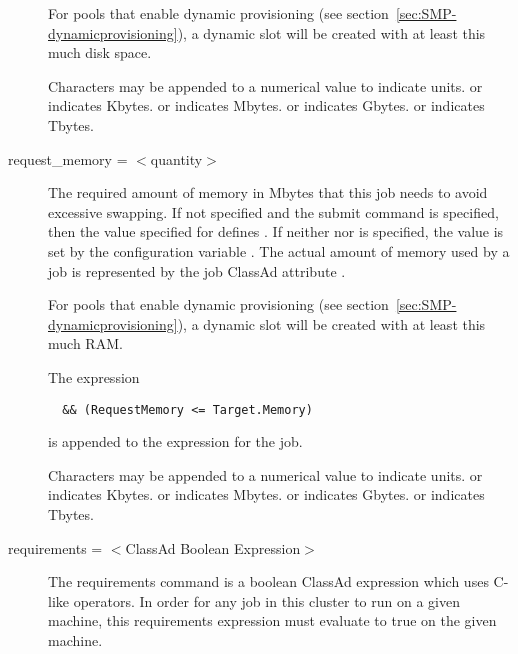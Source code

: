 \begin{description}
For pools that enable
dynamic  provisioning
(see section~\ref{sec:SMP-dynamicprovisioning}),
a dynamic slot will be created with at least this much disk space.

Characters may be appended to a numerical value to indicate units. 
 or  indicates Kbytes.
 or  indicates Mbytes.
 or  indicates Gbytes.
 or  indicates Tbytes.


\label{man-condor-submit-request-memory}
\item[request\_memory = $<$quantity$>$] 
The required amount of memory in Mbytes that this job needs
to avoid excessive swapping.
If not specified and the submit command  is specified, 
then the value specified
for  defines .
If neither  nor  is specified,
the value is set by the configuration variable
.
The actual amount of memory used by a job is represented by the
job ClassAd attribute .

For pools that enable
dynamic  provisioning
(see section~\ref{sec:SMP-dynamicprovisioning}),
a dynamic slot will be created with at least this much RAM.

The expression
\begin{verbatim}
  && (RequestMemory <= Target.Memory) 
\end{verbatim}
is appended to the  expression for the job.

Characters may be appended to a numerical value to indicate units. 
 or  indicates Kbytes.
 or  indicates Mbytes.
 or  indicates Gbytes.
 or  indicates Tbytes.


\label{man-condor-submit-requirements}
\item[requirements = $<$ClassAd Boolean Expression$>$]
The requirements
command is a boolean ClassAd expression which uses C-like operators. In
order for any job in this cluster to run on a given machine, this
requirements expression must evaluate to true on the given machine. 



\end{description}
